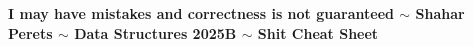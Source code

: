 \documentclass[]{article}
\theoremstyle{definition}
\begin{document}
	\vfil
	\textbf{I may have mistakes and correctness is not guaranteed $\sim$ Shahar Perets $\sim$ Data Structures 2025B $\sim$ Shit Cheat Sheet}
	
	
	
\end{document}
